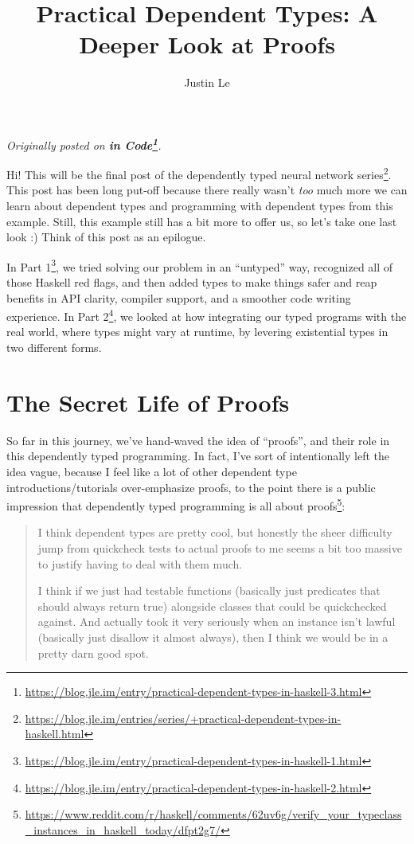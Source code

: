 \documentclass[]{article}
\title{Practical Dependent Types: A Deeper Look at Proofs}
\author{Justin Le}
\renewcommand{\href}[2]{#2\footnote{\url{#1}}}
\begin{document}
\maketitle

\emph{Originally posted on
\textbf{\href{https://blog.jle.im/entry/practical-dependent-types-in-haskell-3.html}{in
Code}}.}

Hi! This will be the final post of the
\href{https://blog.jle.im/entries/series/+practical-dependent-types-in-haskell.html}{dependently
typed neural network series}. This post has been long put-off because there
really wasn't \emph{too} much more we can learn about dependent types and
programming with dependent types from this example. Still, this example still
has a bit more to offer us, so let's take one last look :) Think of this post as
an epilogue.

In
\href{https://blog.jle.im/entry/practical-dependent-types-in-haskell-1.html}{Part
1}, we tried solving our problem in an ``untyped'' way, recognized all of those
Haskell red flags, and then added types to make things safer and reap benefits
in API clarity, compiler support, and a smoother code writing experience. In
\href{https://blog.jle.im/entry/practical-dependent-types-in-haskell-2.html}{Part
2}, we looked at how integrating our typed programs with the real world, where
types might vary at runtime, by levering existential types in two different
forms.

\hypertarget{the-secret-life-of-proofs}{%
\section{The Secret Life of Proofs}\label{the-secret-life-of-proofs}}

So far in this journey, we've hand-waved the idea of ``proofs'', and their role
in this dependently typed programming. In fact, I've sort of intentionally left
the idea vague, because I feel like a lot of other dependent type
introductions/tutorials over-emphasize proofs, to the point there is a public
impression that
\href{https://www.reddit.com/r/haskell/comments/62uv6g/verify_your_typeclass_instances_in_haskell_today/dfpt2g7/}{dependently
typed programming is all about proofs}:

\begin{quote}
I think dependent types are pretty cool, but honestly the sheer difficulty jump
from quickcheck tests to actual proofs to me seems a bit too massive to justify
having to deal with them much.

I think if we just had testable functions (basically just predicates that should
always return true) alongside classes that could be quickchecked against. And
actually took it very seriously when an instance isn't lawful (basically just
disallow it almost always), then I think we would be in a pretty darn good spot.
\end{quote}
\end{document}
